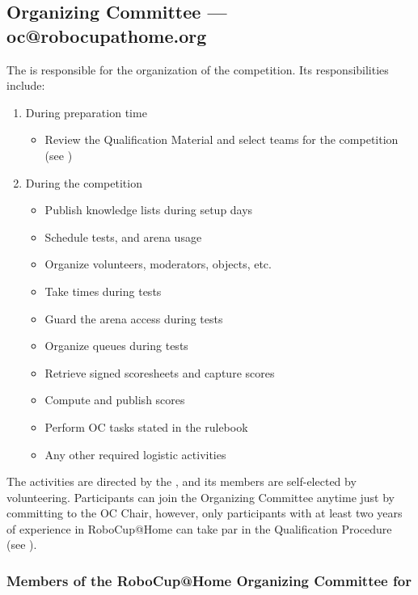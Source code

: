 %
%
\subsection{Organizing Committee --- oc@robocupathome.org}
\label{sec:oc}
The  is responsible for the organization of the competition. Its responsibilities include:

\begin{enumerate}
  \item During preparation time
  \begin{itemize}
    \item Review the Qualification Material and select teams for the competition (see )
  \end{itemize}
  \item During the competition
  \begin{itemize}
    \item Publish knowledge lists during setup days
    \item Schedule tests, and arena usage
    \item Organize volunteers, moderators, objects, etc.
    \item Take times during tests
    \item Guard the arena access during tests
    \item Organize queues during tests
    \item Retrieve signed scoresheets and capture scores
    \item Compute and publish scores
    \item Perform OC tasks stated in the rulebook
    \item Any other required logistic activities
  \end{itemize}
\end{enumerate}

The  activities are directed by the , and its members are self-elected by volunteering. Participants can join the Organizing Committee anytime just by committing to the OC Chair, however, only participants with at least two years of experience in RoboCup@Home can take par in the Qualification Procedure (see ).

\subsubsection{Members of the RoboCup@Home Organizing Committee for \YEAR}

